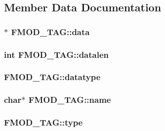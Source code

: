 \subsection{Member Data Documentation}
\hypertarget{struct_f_m_o_d___t_a_g_a86247271797eb33118a5fff813c1e548}{
\subsubsection[{data}]{$\ast$ F\-M\-O\-D\-\_\-\-T\-A\-G\-::data}}\label{struct_f_m_o_d___t_a_g_a86247271797eb33118a5fff813c1e548}
\hypertarget{struct_f_m_o_d___t_a_g_a589281f4f1adc717798744722ec43761}{
\subsubsection[{datalen}]{ {\bf int} F\-M\-O\-D\-\_\-\-T\-A\-G\-::datalen}}\label{struct_f_m_o_d___t_a_g_a589281f4f1adc717798744722ec43761}
\hypertarget{struct_f_m_o_d___t_a_g_acc0f4bf92ee045d5828ba7eccc3c4c23}{
\subsubsection[{datatype}]{ F\-M\-O\-D\-\_\-\-T\-A\-G\-::datatype}}\label{struct_f_m_o_d___t_a_g_acc0f4bf92ee045d5828ba7eccc3c4c23}
\hypertarget{struct_f_m_o_d___t_a_g_a200d18627ec871638bb7df841a77b2ab}{
\subsubsection[{name}]{\setlength{\rightskip}{0pt plus 5cm}char$\ast$ F\-M\-O\-D\-\_\-\-T\-A\-G\-::name}}\label{struct_f_m_o_d___t_a_g_a200d18627ec871638bb7df841a77b2ab}
\hypertarget{struct_f_m_o_d___t_a_g_ad891c5f78e72ffeebc0f39e34e5b1b20}{
\subsubsection[{type}]{ F\-M\-O\-D\-\_\-\-T\-A\-G\-::type}}\label{struct_f_m_o_d___t_a_g_ad891c5f78e72ffeebc0f39e34e5b1b20}
